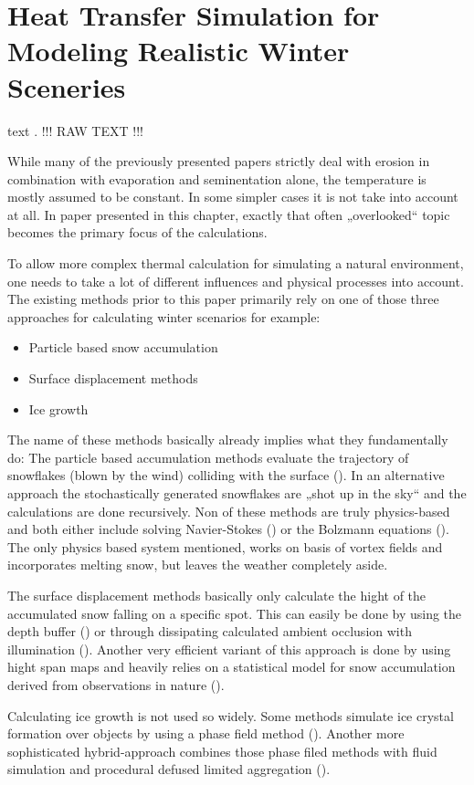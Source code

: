 \section{Heat Transfer Simulation for Modeling Realistic Winter Sceneries}

text \cite{benes2001layered}.
!!! RAW TEXT !!!

While many of the previously presented papers strictly deal with erosion in combination with evaporation and seminentation alone, the temperature is mostly assumed to be constant. In some simpler cases it is not take into account at all. In paper presented in this chapter, exactly that often „overlooked“ topic becomes the primary focus of the calculations.

To allow more complex thermal calculation for simulating a natural environment, one needs to take a lot of different influences and physical processes into account. The existing methods prior to this paper primarily rely on one of those three approaches for calculating winter scenarios for example:
\begin{itemize}
	\item Particle based snow accumulation
	\item Surface displacement methods
	\item Ice growth
\end{itemize}

The name of these methods basically already implies what they fundamentally do:
The particle based accumulation methods evaluate the trajectory of snowflakes (blown by the wind) colliding with the surface (). In an alternative approach the stochastically generated snowflakes are „shot up in the sky“ and the calculations are done recursively. Non of these methods are truly physics-based and both either include solving Navier-Stokes () or the Bolzmann equations (). The only physics based system mentioned, works on basis of vortex fields and incorporates melting snow, but leaves the weather completely aside.

The surface displacement methods basically only calculate the hight of the accumulated snow falling on a specific spot. This can easily be done by using the depth buffer () or through dissipating calculated ambient occlusion with illumination (). Another very efficient variant of this approach is done by using hight span maps and heavily relies on a statistical model for snow accumulation derived from observations in nature ().

Calculating ice growth is not used so widely. Some methods simulate ice crystal formation over objects by using a phase field method (). Another more sophisticated hybrid-approach combines those phase filed methods with fluid simulation and procedural defused limited aggregation ().

